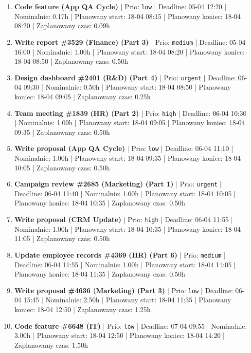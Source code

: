 {\begin{enumerate}
  \item [\textbf{14703}] \textbf{Code feature (App QA Cycle)} | Prio: \texttt{low} | Deadline: 05-04 12:20 | Nominalnie: 0.17h | Planowany start: 18-04 08:15 | Planowany koniec: 18-04 08:20 | Zaplanowany czas: 0.09h
  \item [\textbf{14672}] \textbf{Write report \#3529 (Finance) (Part 3)} | Prio: \texttt{medium} | Deadline: 05-04 16:00 | Nominalnie: 1.00h | Planowany start: 18-04 08:20 | Planowany koniec: 18-04 08:50 | Zaplanowany czas: 0.50h
  \item [\textbf{14603}] \textbf{Design dashboard \#2401 (R\&D) (Part 4)} | Prio: \texttt{urgent} | Deadline: 06-04 09:30 | Nominalnie: 0.50h | Planowany start: 18-04 08:50 | Planowany koniec: 18-04 09:05 | Zaplanowany czas: 0.25h
  \item [\textbf{14610}] \textbf{Team meeting \#1839 (HR) (Part 2)} | Prio: \texttt{high} | Deadline: 06-04 10:30 | Nominalnie: 1.00h | Planowany start: 18-04 09:05 | Planowany koniec: 18-04 09:35 | Zaplanowany czas: 0.50h
  \item [\textbf{14695}] \textbf{Write proposal (App QA Cycle)} | Prio: \texttt{low} | Deadline: 06-04 11:10 | Nominalnie: 1.00h | Planowany start: 18-04 09:35 | Planowany koniec: 18-04 10:05 | Zaplanowany czas: 0.50h
  \item [\textbf{14607}] \textbf{Campaign review \#2685 (Marketing) (Part 1)} | Prio: \texttt{urgent} | Deadline: 06-04 11:40 | Nominalnie: 1.00h | Planowany start: 18-04 10:05 | Planowany koniec: 18-04 10:35 | Zaplanowany czas: 0.50h
  \item [\textbf{14629}] \textbf{Write proposal (CRM Update)} | Prio: \texttt{high} | Deadline: 06-04 11:55 | Nominalnie: 1.00h | Planowany start: 18-04 10:35 | Planowany koniec: 18-04 11:05 | Zaplanowany czas: 0.50h
  \item [\textbf{14658}] \textbf{Update employee records \#4369 (HR) (Part 6)} | Prio: \texttt{medium} | Deadline: 06-04 11:55 | Nominalnie: 1.00h | Planowany start: 18-04 11:05 | Planowany koniec: 18-04 11:35 | Zaplanowany czas: 0.50h
  \item [\textbf{14684}] \textbf{Write proposal \#4636 (Marketing) (Part 3)} | Prio: \texttt{low} | Deadline: 06-04 15:45 | Nominalnie: 2.50h | Planowany start: 18-04 11:35 | Planowany koniec: 18-04 12:50 | Zaplanowany czas: 1.25h
  \item [\textbf{14683}] \textbf{Code feature \#6648 (IT)} | Prio: \texttt{low} | Deadline: 07-04 09:55 | Nominalnie: 3.00h | Planowany start: 18-04 12:50 | Planowany koniec: 18-04 14:20 | Zaplanowany czas: 1.50h

\end{enumerate}}
